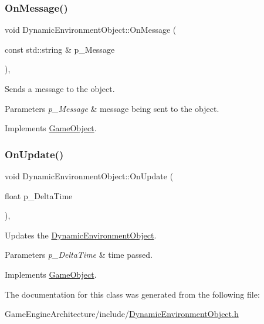\subsubsection{\texorpdfstring{OnMessage()}{OnMessage()}}
{\footnotesize\ttfamily void Dynamic\+Environment\+Object\+::\+On\+Message (\begin{DoxyParamCaption}\item[{const std\+::string \&}]{p\+\_\+\+Message }\end{DoxyParamCaption})\hspace{0.3cm}{\ttfamily [override]}, {\ttfamily [virtual]}}



Sends a message to the object. 


\begin{DoxyParams}{Parameters}
{\em p\+\_\+\+Message} & message being sent to the object. \\
\hline
\end{DoxyParams}


Implements \mbox{\hyperlink{class_game_object_a162f15f809f5181e3264b9f4d768bea2}{Game\+Object}}.

\mbox{\label{class_dynamic_environment_object_a74f519772b818b7f82abec0a70ca59ce}} 
\subsubsection{\texorpdfstring{OnUpdate()}{OnUpdate()}}
{\footnotesize\ttfamily void Dynamic\+Environment\+Object\+::\+On\+Update (\begin{DoxyParamCaption}\item[{float}]{p\+\_\+\+Delta\+Time }\end{DoxyParamCaption})\hspace{0.3cm}{\ttfamily [override]}, {\ttfamily [virtual]}}



Updates the \mbox{\hyperlink{class_dynamic_environment_object}{Dynamic\+Environment\+Object}}. 


\begin{DoxyParams}{Parameters}
{\em p\+\_\+\+Delta\+Time} & time passed. \\
\hline
\end{DoxyParams}


Implements \mbox{\hyperlink{class_game_object_a3d4444ab3efd5e3041014da90a66c081}{Game\+Object}}.



The documentation for this class was generated from the following file\+:\begin{DoxyCompactItemize}
\item 
Game\+Engine\+Architecture/include/\mbox{\hyperlink{_dynamic_environment_object_8h}{Dynamic\+Environment\+Object.\+h}}\end{DoxyCompactItemize}
